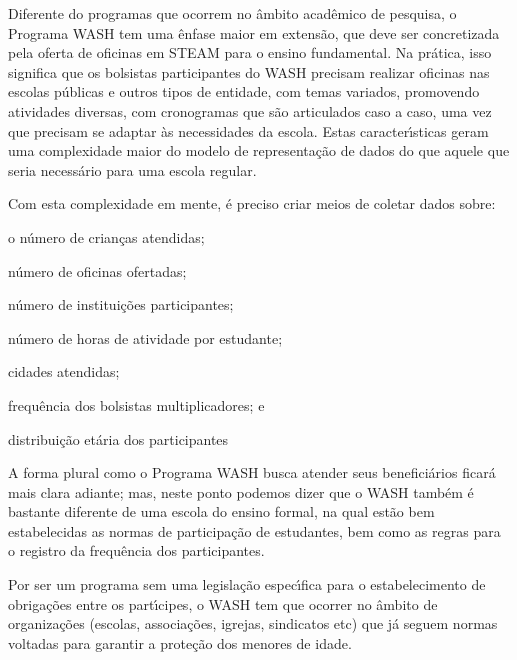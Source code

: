 \documentclass[
12pt,		%
openright,	%
twoside,  %
a4paper,			%
chapter=TITLE,		%
english,			%
french,				%
spanish,			%
brazil				%
]{USPSC-classe/USPSC}
\begin{document}
Diferente do programas que ocorrem no \^ambito acad\^emico de pesquisa, o Programa WASH tem uma \^enfase maior em extens\~ao, que deve ser concretizada pela oferta de oficinas em STEAM para o ensino fundamental. Na pr\'atica, isso significa que os bolsistas participantes do WASH precisam realizar oficinas nas escolas p\'ublicas e outros tipos de entidade, com temas variados, promovendo atividades diversas, com cronogramas que s\~ao articulados caso a caso, uma vez que precisam se adaptar \`as necessidades da escola. Estas caracter\'{\i}sticas geram uma complexidade maior do modelo de representa\c{c}\~ao de dados do que aquele que seria necess\'ario para uma escola regular.








Com esta complexidade em mente, \'e preciso criar meios de coletar dados sobre:









\begin{alineas}
\item o n\'umero de crian\c{c}as atendidas;
\item n\'umero de oficinas ofertadas;
\item n\'umero de institui\c{c}\~oes participantes;
\item n\'umero de horas de atividade por estudante;
\item cidades atendidas;
\item frequ\^encia dos bolsistas multiplicadores; e
\item distribui\c{c}\~ao et\'aria dos participantes
\end{alineas}










A forma plural como o Programa WASH busca atender seus benefici\'arios ficar\'a mais clara adiante; mas, neste ponto podemos dizer que o WASH tamb\'em \'e bastante diferente de uma escola do ensino formal, na qual est\~ao bem estabelecidas as normas de participa\c{c}\~ao de estudantes, bem como as regras para o registro da frequ\^encia dos participantes.








Por ser um programa sem uma legisla\c{c}\~ao espec\'{\i}fica para o estabelecimento de obriga\c{c}\~oes entre os part\'{\i}cipes, o WASH tem que ocorrer no \^ambito de organiza\c{c}\~oes (escolas, associa\c{c}\~oes, igrejas, sindicatos etc) que j\'a seguem normas voltadas para garantir a prote\c{c}\~ao dos menores de idade.
\end{document}
